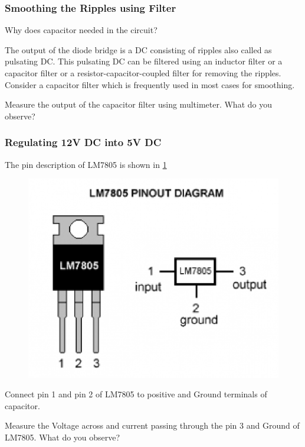 \documentclass[journal,12pt,twocolumn]{IEEEtran}
\begin{document}
\subsubsection{Smoothing the Ripples using Filter}
\begin{problem}
Why does capacitor needed in the circuit?
\end{problem}
\solution
The output of the diode bridge is a DC consisting of ripples also called as pulsating DC. This pulsating DC can be filtered using an inductor filter or a capacitor filter or a resistor-capacitor-coupled filter for removing the ripples. Consider a capacitor filter which is frequently used in most cases for smoothing.
\begin{problem}
Measure the output of the capacitor filter using multimeter. What do you observe?
\end{problem}
\subsubsection{Regulating 12V DC into 5V DC}
The pin description of LM7805 is shown in \ref{fig3}
\begin{figure}[h]
\centering
	\includegraphics[scale=0.4]{./figs/Lm7805.eps}
	\caption{}  \label{fig3}
    \end{figure}

\begin{problem}
Connect pin 1 and pin 2 of LM7805 to positive and Ground terminals of capacitor. 
\end{problem} 
\begin{problem}
Measure the Voltage across  and current passing through the pin 3 and Ground of LM7805. What do you observe?
\end{problem}
\end{document}
